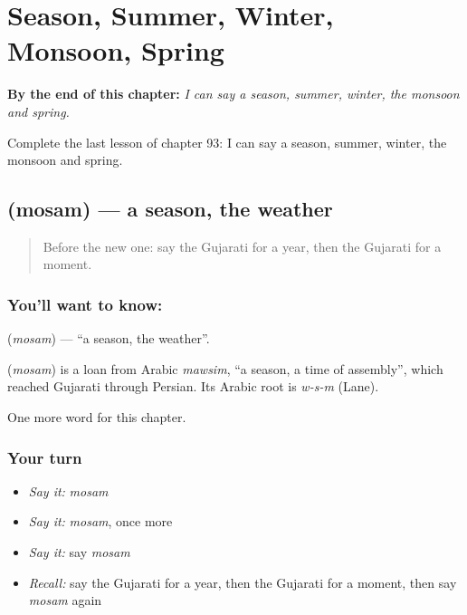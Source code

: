 
\chapter{Season, Summer, Winter, Monsoon, Spring}
\label{ch:gu-season-summer-winter-monsoon-spring}

\begin{chapteropening}
\textbf{By the end of this chapter:} \emph{I can say a season, summer, winter, the monsoon and spring.}

Complete the last lesson of chapter 93: I can say a season, summer, winter, the monsoon and spring.
\end{chapteropening}

\section[\texorpdfstring{\gu{મોસમ} (mosam)}{મોસમ (mosam)}]{ (mosam) — a season, the weather}

\label{lesson:GU-C93-mosam}



\begin{quote}
Before the new one: say the Gujarati for a year, then the Gujarati for a moment.
\end{quote}

\subsection*{You'll want to know: }
\textbf{} (\emph{mosam}) — \textquotedblleft{}a season, the weather\textquotedblright{}.

\begin{cousinweb}
\textbf{} (\emph{mosam}) is a loan from Arabic \emph{mawsim}, \textquotedblleft{}a season, a time of assembly\textquotedblright{}, which reached Gujarati through Persian. Its Arabic root is \emph{w-s-m} (Lane).
\end{cousinweb}

\begin{grammarlens}[title={What you've built}]
One more word for this chapter.
\end{grammarlens}

\subsection*{Your turn}
\begin{itemize}
\raggedright
  \item \emph{Say it:} \emph{mosam}
  \item \emph{Say it:} \emph{mosam}, once more
  \item \emph{Say it:} say \emph{mosam}
  \item \emph{Recall:} say the Gujarati for a year, then the Gujarati for a moment, then say \emph{mosam} again
\end{itemize}

